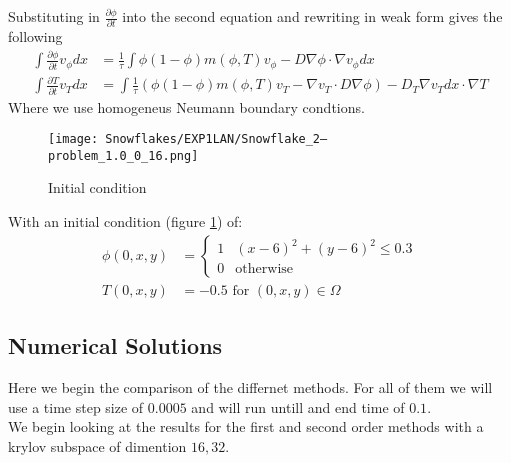 Substituting in $\frac{\partial \phi}{\partial t}$ into the second equation and rewriting in weak form gives the following
\begin{align*}
    \int \frac{\partial \phi}{\partial t} v_{\phi}dx &=  \frac 1{\tau}\int \phi(1-\phi)m(\phi,T)v_{\phi} - D \nabla \phi \cdot \nabla v_{\phi}dx\\
    \int \frac{\partial T}{\partial t} v_T dx &= \int \frac 1{\tau}(\phi(1-\phi)m(\phi,T)v_T - \nabla v_T \cdot D \nabla \phi) - D_T \nabla v_Tdx \cdot \nabla T
\end{align*}
Where we use homogeneus Neumann boundary condtions.
\begin{figure}[H]
    \centering
    \texttt{[image: Snowflakes/EXP1LAN/Snowflake\_2--problem\_1.0\_0\_16.png]} %
    \caption{Initial condition}
    \label{fig:initial}
\end{figure}
With an initial condition (figure \ref{fig:initial}) of: 
\begin{align*}
    \phi(0,x,y) &= \begin{cases} 
      1 & (x - 6)^2 + (y - 6)^2 \leq 0.3 \\
      0 & \text{otherwise} \end{cases}\\
    T(0,x,y) &= -0.5 \text{  for  } (0,x,y)\in \Omega
\end{align*}

\subsection{Numerical Solutions}
Here we begin the comparison of the differnet methods.
For all of them we will use a time step size of $0.0005$ and will run untill and end time of $0.1$.\\

We begin looking at the results for the first and second order methods with a krylov subspace of dimention $16, 32$.

